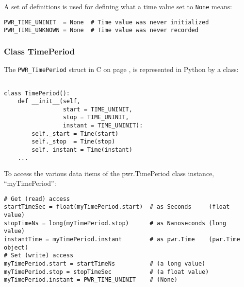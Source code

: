 \documentclass[12pt]{report} %
\begin{document}
\begin{appendices}
A set of definitions is used for defining what a time value set to
\texttt{None} means:

\begin{center}\begin{minipage}{.95\linewidth}\begin{lstlisting}
PWR_TIME_UNINIT  = None  # Time value was never initialized
PWR_TIME_UNKNOWN = None  # Time value was never recorded
\end{lstlisting}\end{minipage}\end{center}

\subsubsection{Class TimePeriod} \label{class:TimePeriod}

The \texttt{PWR_TimePeriod} struct in C on page \pageref{type:TimePeriod}, is
represented in Python by a class:

\begin{center}\begin{minipage}{.95\linewidth}\begin{lstlisting}

class TimePeriod():
    def __init__(self,
                 start = TIME_UNINIT,
                 stop = TIME_UNINIT,
                 instant = TIME_UNINIT):
        self._start = Time(start)
        self._stop  = Time(stop)
        self._instant = Time(instant)
    ...
\end{lstlisting}\end{minipage}\end{center}

To access the various data items of the pwr.TimePeriod class instance,
``myTimePeriod'': 

\begin{center}\begin{minipage}{.95\linewidth}\begin{lstlisting}
# Get (read) access
startTimeSec = float(myTimePeriod.start)  # as Seconds     (float value)
stopTimeNs = long(myTimePeriod.stop)      # as Nanoseconds (long value)
instantTime = myTimePeriod.instant        # as pwr.Time    (pwr.Time object)
# Set (write) access
myTimePeriod.start = startTimeNs          # (a long value)
myTimePeriod.stop = stopTimeSec           # (a float value)
myTimePeriod.instant = PWR_TIME_UNINIT    # (None)
\end{lstlisting}\end{minipage}\end{center}


\end{appendices}
\end{document}
